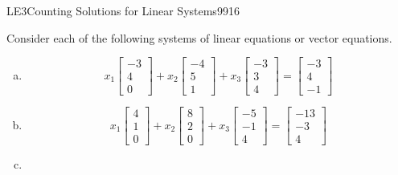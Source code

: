\begin{exercise}{LE3}{Counting Solutions for Linear Systems}{9916} 
\begin{exerciseStatement} 

 Consider each of the following systems of linear equations or vector equations. 

 

\begin{enumerate}[(a)]
\item  

 \[
              x_{1} \left[\begin{array}{c}
-3 \\
4 \\
0
\end{array}\right] + x_{2} \left[\begin{array}{c}
-4 \\
5 \\
1
\end{array}\right] + x_{3} \left[\begin{array}{c}
-3 \\
3 \\
4
\end{array}\right] = \left[\begin{array}{c}
-3 \\
4 \\
-1
\end{array}\right]
            \] 

 
\item  

 \[
              x_{1} \left[\begin{array}{c}
4 \\
1 \\
0
\end{array}\right] + x_{2} \left[\begin{array}{c}
8 \\
2 \\
0
\end{array}\right] + x_{3} \left[\begin{array}{c}
-5 \\
-1 \\
4
\end{array}\right] = \left[\begin{array}{c}
-13 \\
-3 \\
4
\end{array}\right]
            \] 

 
\item  


\end{enumerate}
\end{exerciseStatement}
\end{exercise}
